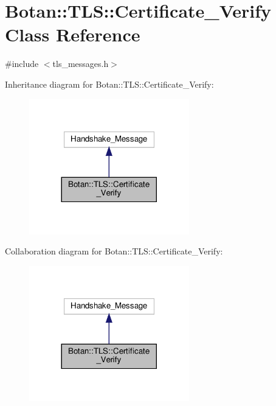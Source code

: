 \hypertarget{class_botan_1_1_t_l_s_1_1_certificate___verify}{}\section{Botan\+:\+:T\+LS\+:\+:Certificate\+\_\+\+Verify Class Reference}
\label{class_botan_1_1_t_l_s_1_1_certificate___verify}


{\ttfamily \#include $<$tls\+\_\+messages.\+h$>$}



Inheritance diagram for Botan\+:\+:T\+LS\+:\+:Certificate\+\_\+\+Verify\+:
\nopagebreak
\begin{figure}[H]
\begin{center}
\leavevmode
\includegraphics[width=197pt]{class_botan_1_1_t_l_s_1_1_certificate___verify__inherit__graph}
\end{center}
\end{figure}


Collaboration diagram for Botan\+:\+:T\+LS\+:\+:Certificate\+\_\+\+Verify\+:
\nopagebreak
\begin{figure}[H]
\begin{center}
\leavevmode
\includegraphics[width=197pt]{class_botan_1_1_t_l_s_1_1_certificate___verify__coll__graph}
\end{center}
\end{figure}
